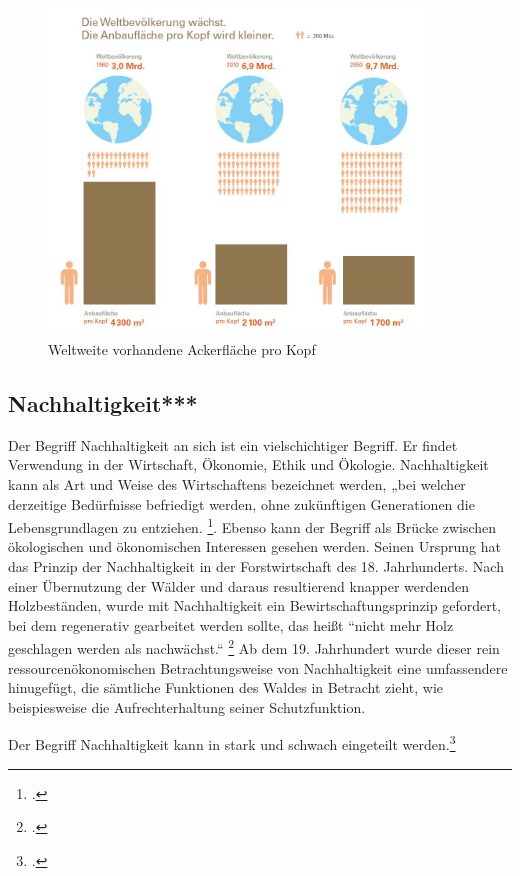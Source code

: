 \documentclass{scrartcl}
\begin{document}
\begin{figure}[htbp]
\centering
\includegraphics[width=10cm]{image_folder/weltbevoelkerung_anbauflaeche_pro_kopf.jpg}
\caption{Weltweite vorhandene Ackerfläche pro Kopf}
\label{fig:AckerproKopf}
\end{figure}

\subsection{Nachhaltigkeit***}

Der Begriff Nachhaltigkeit an sich ist ein vielschichtiger Begriff. Er findet Verwendung in der Wirtschaft, Ökonomie, Ethik und Ökologie. Nachhaltigkeit kann als Art und Weise des Wirtschaftens bezeichnet werden, „bei welcher derzeitige Bedürfnisse befriedigt werden, ohne zukünftigen Generationen die Lebensgrundlagen zu entziehen. \footcite{DefinitionWirtschaftslexikonb}. Ebenso kann der Begriff als Brücke zwischen ökologischen und ökonomischen Interessen gesehen werden. Seinen Ursprung hat das Prinzip der Nachhaltigkeit in der Forstwirtschaft des 18. Jahrhunderts. Nach einer Übernutzung der Wälder und daraus resultierend knapper werdenden Holzbeständen, wurde mit Nachhaltigkeit ein Bewirtschaftungsprinzip gefordert, bei dem regenerativ gearbeitet werden sollte, das heißt “nicht mehr Holz geschlagen werden als nachwächst.“ \footcite{NachhaltigeBrockhaus.de}
Ab dem 19. Jahrhundert wurde dieser rein ressourcenökonomischen Betrachtungsweise von Nachhaltigkeit eine umfassendere hinugefügt, die sämtliche Funktionen des Waldes in Betracht zieht, wie beispiesweise die Aufrechterhaltung seiner Schutzfunktion.

\hfill \break
Der Begriff Nachhaltigkeit kann in stark und schwach eingeteilt werden.\footcite{Nachhaltigkeit}
\end{document}
